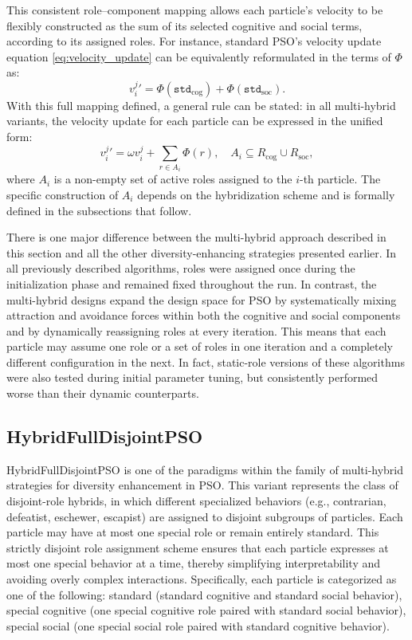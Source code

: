 {This consistent role--component mapping allows each particle’s velocity to be flexibly constructed as the sum of its selected cognitive and social terms, according to its assigned roles. For instance, standard PSO's velocity update equation \eqref{eq:velocity_update} can be equivalently reformulated in the terms of $\Phi$ as:
\begin{equation}\label{eq:velocity_update_reformulated}
    v_{i}^{j}{}' = \Phi(\texttt{std}_\text{cog}) +  \Phi(\texttt{std}_\text{soc}).
\end{equation}
With this full mapping defined, a general rule can be stated: in all multi-hybrid variants, the velocity update for each particle can be expressed in the unified form:
\begin{equation}\label{eq:velocity_update_universal}
    v_{i}^{j}{}' = \omega v_{i}^{j} + \sum_{r \in A_i} \Phi(r),
\quad 
A_i \subseteq R_\text{cog} \cup R_\text{soc},
\end{equation}
where $A_i$ is a non-empty set of active roles assigned to the $i$-th particle.
The specific construction of $A_i$ depends on the hybridization scheme and is formally defined in the subsections that follow.


There is one major difference between the multi-hybrid approach described in this section and all the other diversity-enhancing strategies presented earlier. In all previously described algorithms, roles were assigned once during the initialization phase and remained fixed throughout the run. In contrast, the multi-hybrid designs expand the design space for PSO by systematically mixing attraction and avoidance forces within both the cognitive and social components and by dynamically reassigning roles at every iteration. This means that each particle may assume one role or a set of roles in one iteration and a completely different configuration in the next. In fact, static-role versions of these algorithms were also tested during initial parameter tuning, but consistently performed worse than their dynamic counterparts.




\subsection{HybridFullDisjointPSO}


HybridFullDisjointPSO is one of the paradigms within the family of multi-hybrid strategies for diversity enhancement in PSO.
This variant represents the class of disjoint-role hybrids, in which different specialized behaviors (e.g., contrarian, defeatist, eschewer, escapist) are assigned to disjoint subgroups of particles. Each particle may have at most one special role or remain entirely standard. This strictly disjoint role assignment scheme ensures that each particle expresses at most one special behavior at a time, thereby simplifying interpretability and avoiding overly complex interactions. Specifically, each particle is categorized as one of the following: standard (standard cognitive and standard social behavior),  special cognitive (one special cognitive role paired with standard social behavior), special social (one special social role paired with standard cognitive behavior).


}
